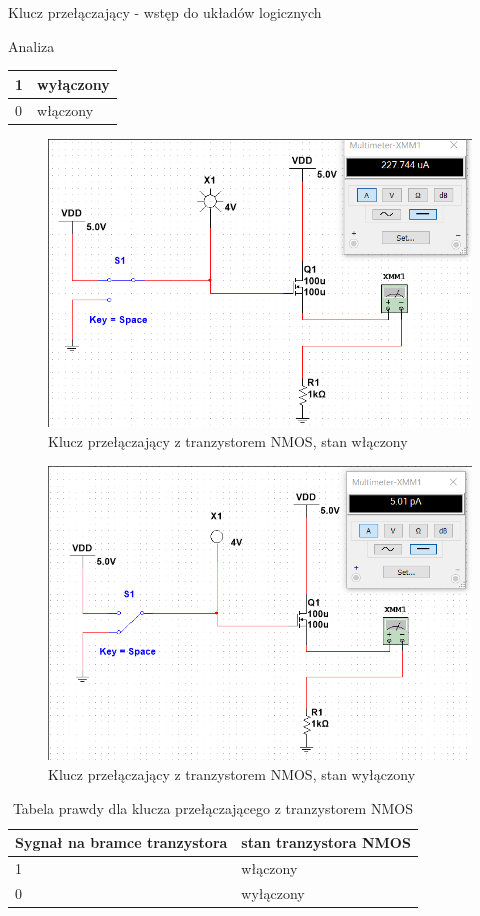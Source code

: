 \documentclass[a4paper]{scrartcl}
\begin{document}
\begin{section}{Klucz przełączający - wstęp do układów logicznych}
\begin{subsection}{Analiza}
\begin{table}[!ht]
\begin{center}
\begin{tabular}{| l | l |}
						1 & wyłączony \\ \hline
						0 & włączony \\ \hline
					\end{tabular}
					\end{center}
				\end{table}
				\begin{figure}[!ht]
				\begin{center}
					\includegraphics[width=0.65\linewidth]{exercise-6-tranzystor-wstep-circuit-nmos-on}
					\caption{Klucz przełączający z tranzystorem NMOS, stan włączony}
					\label{fig:circuit-4-n-on}
				\end{center}
				\end{figure}
				\begin{figure}[!ht]
				\begin{center}
					\includegraphics[width=0.65\linewidth]{exercise-6-tranzystor-wstep-circuit-nmos-off}
					\caption{Klucz przełączający z tranzystorem NMOS, stan wyłączony}
					\label{fig:circuit-4-n-off}
				\end{center}
				\end{figure}
				\begin{table}[!ht]
					\begin{center}
					\caption{Tabela prawdy dla klucza przełączającego z tranzystorem NMOS}
					\begin{tabular}{| l | l |}
						\hline
						Sygnał na bramce tranzystora & stan tranzystora NMOS \\\hline
						1 & włączony \\ \hline
						0 & wyłączony \\ \hline
					\end{tabular}
					\end{center}
				\end{table}


\end{subsection}
\end{section}
\end{document}
